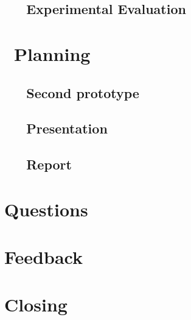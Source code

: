 \documentclass[a4paper,twoside,11pt]{article}
\begin{document}
	\subsection{\ \ \ Experimental Evaluation}
	
\section{\ Planning}
	\subsection{\ \ \ Second prototype }
	\subsection{\ \ \ Presentation }
	\subsection{\ \ \ Report }

\section{Questions}

\section{Feedback}

\section{Closing}
\end{document}
